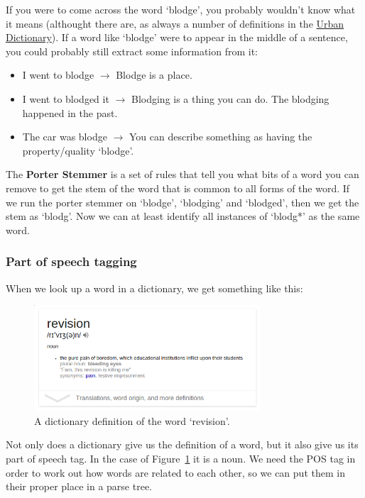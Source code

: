 If you were to come across the word `blodge', you probably wouldn't know what it
means (althought there are, as always a number of definitions in the
\href{http://www.urbandictionary.com/define.php?term=blodge}{Urban Dictionary}).
If a word like `blodge' were to appear in the middle of a sentence, you could
probably still extract some information from it:

\begin{itemize}
  \item I went to blodge $\rightarrow$ Blodge is a place.
  \item I went to blodged it $\rightarrow$ Blodging is a thing you can do.
    The blodging happened in the past.
  \item The car was blodge $\rightarrow$ You can describe something as having 
    the property/quality `blodge'.
\end{itemize}

The \textbf{Porter Stemmer} is a set of rules that tell you what bits of a word
you can remove to get the stem of the word that is common to all forms of the
word. If we run the porter stemmer on `blodge', `blodging' and `blodged', then
we get the stem as `blodg'. Now we can at least identify all instances of
`blodg*' as the same word.

\subsubsection{Part of speech tagging}

When we look up a word in a dictionary, we get something like this:

\begin{figure}[H]
  \centering
  \includegraphics[width=0.75\textwidth]{images/revision-definition}
  \caption{A dictionary definition of the word `revision'.}
  \label{fig:revision-definition}
\end{figure}

Not only does a dictionary give us the definition of a word, but it also give us
its part of speech tag. In the case of Figure~\ref{fig:revision-definition} it
is a noun. We need the POS tag in order to work out how words are related to
each other, so we can put them in their proper place in a parse tree.

